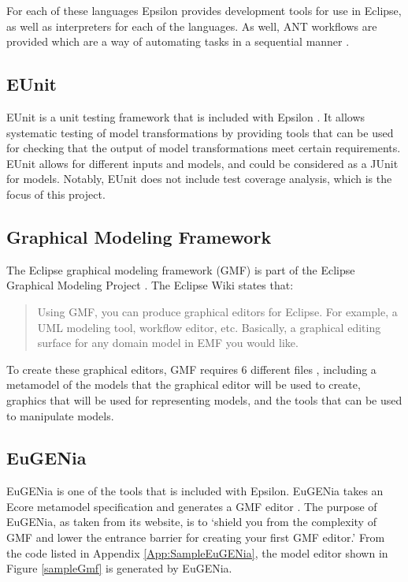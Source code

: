 For each of these languages Epsilon provides development tools for use in Eclipse, as well as interpreters for each of the languages. As well, ANT workflows are provided which are a way of automating tasks in a sequential manner \citep{epsilonBook}.

\subsection{EUnit}
EUnit is a unit testing framework that is included with Epsilon \citep{epsilonWebsite}. It allows systematic testing of model transformations by providing tools that can be used for checking that the output of model transformations meet certain requirements. \citep{epsilonBook} EUnit allows for different inputs and models, and could be considered as a JUnit for models. Notably, EUnit does not include test coverage analysis, which is the focus of this project.

\subsection{Graphical Modeling Framework}

The Eclipse graphical modeling framework (GMF) is part of the Eclipse Graphical Modeling Project \citep{gmpSite}. The Eclipse Wiki \cite{gmpFAQ} states that:

\begin{quote} Using GMF, you can produce graphical editors for Eclipse. For example, a UML modeling tool, workflow editor, etc. Basically, a graphical editing surface for any domain model in EMF you would like. \end{quote}

To create these graphical editors, GMF requires 6 different files \citep{gmfIntro}, including a metamodel of the models that the graphical editor will be used to create, graphics that will be used for representing models, and the tools that can be used to manipulate models.

\subsection{EuGENia}
EuGENia is one of the tools that is included with Epsilon. EuGENia takes an Ecore metamodel specification and generates a GMF editor \citep{eugeniaSite}. The purpose of EuGENia, as taken from its website, is to `shield you from the complexity of GMF and lower the entrance barrier for creating your first GMF editor.' \citep{eugeniaSite} From the code listed in Appendix \ref{App:SampleEuGENia}, the model editor shown in Figure \ref{sampleGmf} is generated by EuGENia.

